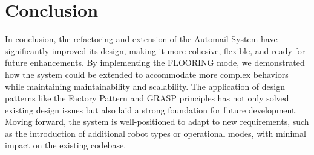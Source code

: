 \documentclass[12pt]{article}
\begin{document}
\section{Conclusion}
In conclusion, the refactoring and extension of the Automail System have significantly improved its design, making it more cohesive, flexible, and ready for future enhancements. By implementing the FLOORING mode, we demonstrated how the system could be extended to accommodate more complex behaviors while maintaining maintainability and scalability. The application of design patterns like the Factory Pattern and GRASP principles has not only solved existing design issues but also laid a strong foundation for future development. Moving forward, the system is well-positioned to adapt to new requirements, such as the introduction of additional robot types or operational modes, with minimal impact on the existing codebase.
\end{document}
